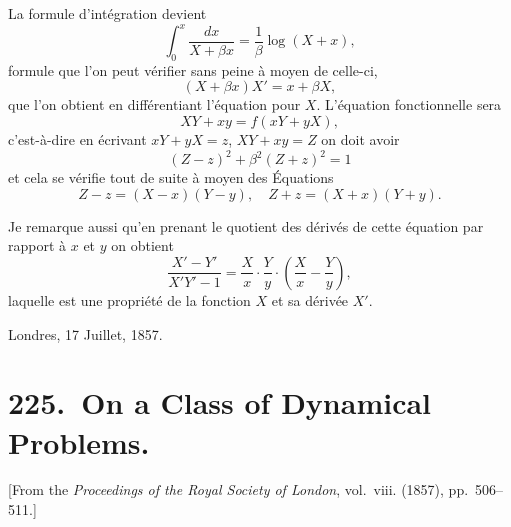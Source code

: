 \documentclass[11pt,a4paper]{book}
\theoremstyle{plain}
\begin{document}
La formule d'int\'{e}gration devient
\[
\int_0^x\frac{dx}{X+\beta x}=\frac{1}{\beta}\log(X+x),
\]
formule que l'on peut v\'{e}rifier sans peine \`{a} moyen de celle-ci,
\[
(X+\beta x)X'=x+\beta X,
\]
que l'on obtient en diff\'{e}rentiant l'\'{e}quation pour $X$. L'\'{e}quation fonctionnelle sera
\[
XY+xy=f(xY+yX),
\]
c'est-\`{a}-dire en \'{e}crivant $xY+yX=z$, $XY+xy=Z$ on doit avoir
\[
(Z-z)^2+\beta^2(Z+z)^2=1
\]
et cela se v\'{e}rifie tout de suite \`{a} moyen des \'{E}quations
\[
Z-z=(X-x)(Y-y),\quad Z+z=(X+x)(Y+y).
\]

Je remarque aussi qu'en prenant le quotient des d\'{e}riv\'{e}s de cette \'{e}quation par rapport \`{a} $x$ et $y$ on obtient
\[
\frac{X'-Y'}{X'Y'-1}=\frac{X}{x}\cdot\frac{Y}{y}\cdot\left(\frac{X}{x}-\frac{Y}{y}\right),
\]
laquelle est une propri\'{e}t\'{e} de la fonction $X$ et sa d\'{e}riv\'{e}e $X'$.

\begin{flushright}
Londres, 17 Juillet, 1857.
\end{flushright}
\newpage

\chapter[On a Class of Dynamical Problems]{225.\ On a Class of Dynamical Problems.}
\label{paper225}

\begin{center}
\small
[From the \textit{Proceedings of the Royal Society of London}, vol.~viii. (1857), pp.~506--511.]
\end{center}

\bigskip
\end{document}
